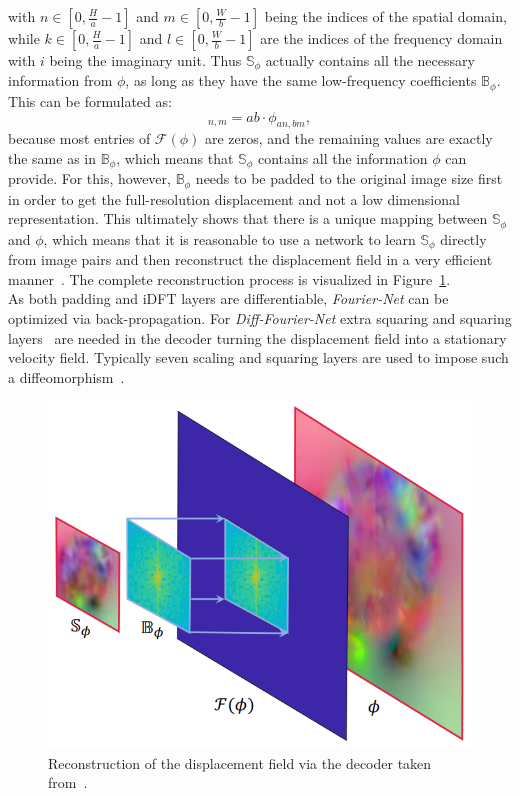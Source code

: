\documentclass[english,version-2022-01]{uzl-thesis} %
\begin{document}
with $n \in [0, \frac{H}{a}-1]$ and $m \in [0, \frac{W}{b}-1]$ being the indices of the spatial domain, while $k \in [0, \frac{H}{a}-1]$ and $l \in [0, \frac{W}{b}-1]$ are the indices of the frequency domain with $i$ being the imaginary unit. Thus $\mathbb{S}_\phi$ actually contains all the necessary information from $\phi$, as long as they have the same low-frequency coefficients $\mathbb{B}_\phi$. This can be formulated as:
\begin{equation}
	[\mathbb{S}_\phi]_{n,m} = ab \cdot \phi_{an,bm},
\end{equation}
because most entries of $\mathcal{F}(\phi)$ are zeros, and the remaining values are exactly the same as in $\mathbb{B}_\phi$, which means that $\mathbb{S}_\phi$ contains all the information $\phi$ can provide. For this, however, $\mathbb{B}_\phi$ needs to be padded to the original image size first in order to get the full-resolution displacement and not a low dimensional representation. This ultimately shows that there is a unique mapping between $\mathbb{S}_\phi$ and $\phi$, which means that it is reasonable to use a network to learn $\mathbb{S}_\phi$ directly from image pairs and then reconstruct the displacement field in a very efficient manner~\cite{Fourier-Net}. The complete reconstruction process is visualized in Figure~\ref{fig:DecoderDisplacementField}.\\
As both padding and iDFT layers are differentiable, \emph{Fourier-Net} can be optimized via back-propagation. For \emph{Diff-Fourier-Net} extra squaring and squaring layers~\cite{Dalca2018} are needed in the decoder turning the displacement field into a stationary velocity field. Typically seven scaling and squaring layers are used to impose such a diffeomorphism~\cite{Fourier-Net,Dalca2018}.
\begin{figure}[htpb]
	\centering
	\graphicspath{{images/}{\main/images/}}
	\includegraphics[width=.65\linewidth]{DecoderDisplacementField.png} 
	\caption{Reconstruction of the displacement field via the decoder taken from~\cite{Fourier-Net+}.}
	\label{fig:DecoderDisplacementField}
\end{figure} 
\end{document}
